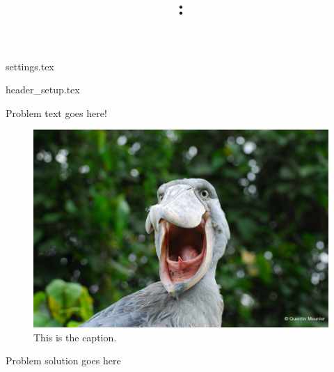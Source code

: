 \documentclass[letterpaper, 10pt, titlepage]{report}
\title{\theTitle\\
\theClass: \theClassName\\
}
\author{\theAuthorName}
\date{\theDueDate}
\begin{document}
\maketitle
{settings.tex}

%

{header_setup.tex}


\begin{problem}{1}
    {
        Problem text goes here!
    }
    {
        \begin{figure}[h!]
            \centering
            \includegraphics[width=0.5\linewidth]{images/birb.jpg}
            \caption{This is the caption.}
        \end{figure}
    }
    \begin{solution}
        Problem solution goes here
    \end{solution}
\end{problem}
\end{document}
